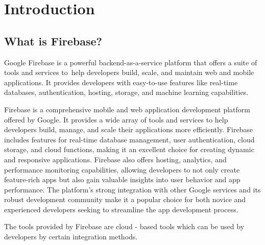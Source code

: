 \documentclass[12pt,a4paper]{report}
\begin{document}
\justifying
\chapter{\fontsize{18}{0}\selectfont Introduction}%
\section{{\fontsize{16}{0}\selectfont What is Firebase? }}%
{\fontsize{14}{0}\selectfont


\noindent 
Google Firebase is a powerful backend-as-a-service platform that offers a suite of tools and services to help developers build, scale, and maintain web and mobile applications. It provides developers with easy-to-use features like real-time databases, authentication, hosting, storage, and machine learning capabilities.

\hspace{1cm}Firebase is a comprehensive mobile and web application development platform offered by Google. It provides a wide array of tools and services to help developers build, manage, and scale their applications more efficiently. Firebase includes features for real-time database management, user authentication, cloud storage, and cloud functions, making it an excellent choice for creating dynamic and responsive applications. Firebase also offers hosting, analytics, and performance monitoring capabilities, allowing developers to not only create feature-rich apps but also gain valuable insights into user behavior and app performance. The platform's strong integration with other Google services and its robust development community make it a popular choice for both novice and experienced developers seeking to streamline the app development process.


\hspace{1cm}The tools provided by Firebase are cloud - based tools which can be used by developers by certain integration methods.

}

\newpage %
\end{document}
